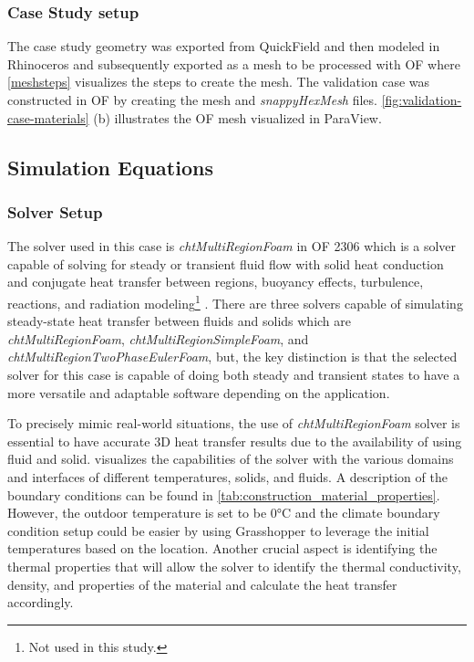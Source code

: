 \subsubsection{Case Study setup}
The case study geometry was exported from QuickField and then modeled in Rhinoceros and subsequently exported as a mesh to be processed with  \gls{OF} where \ref{meshsteps} visualizes the steps to create the mesh. 
The validation case was constructed in \gls{OF} by creating the mesh and \textit{snappyHexMesh} files.  
\ref{fig:validation-case-materials}  (b) illustrates the \gls{OF} mesh visualized in ParaView.
    



\subsection{Simulation Equations}

\subsubsection{Solver Setup}
The solver used in this case is \textit{chtMultiRegionFoam} in  \gls{OF} 2306 which is a solver capable of solving for steady or transient fluid flow with solid heat conduction and conjugate heat transfer between regions, buoyancy effects, turbulence, reactions, and radiation modeling\footnote{Not used in this study.} \cite{cht}.
There are three solvers capable of simulating steady-state heat transfer between fluids and solids which are \textit{chtMultiRegionFoam}, \textit{chtMultiRegionSimpleFoam}, and \textit{chtMultiRegionTwoPhaseEulerFoam}, but, the key distinction is that the selected solver for this case is capable of doing both steady and transient states to have a more versatile and adaptable software depending on the application. 


To precisely mimic real-world situations, the use of \textit{ chtMultiRegionFoam} solver is essential to have accurate 3D heat transfer results due to the availability of using fluid and solid.  visualizes the capabilities of the solver with the various domains and interfaces of different temperatures, solids, and fluids. 
A description of the boundary conditions can be found in \cref{tab:construction_material_properties}. 
However, the outdoor temperature is set to be 0°C and the climate boundary condition setup could be easier by using Grasshopper to leverage the initial temperatures based on the location. 
Another crucial aspect is identifying the thermal properties that will allow the solver to identify the thermal conductivity, density, and properties of the material and calculate the heat transfer accordingly.

